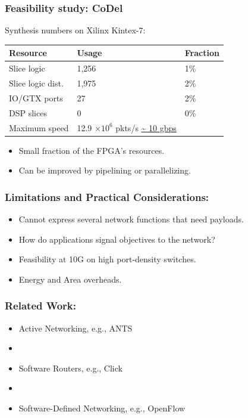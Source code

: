 \begin{Large}
\begin{frame}[plain]
\frametitle{Feasibility study: CoDel}
\begin{center}
Synthesis numbers on Xilinx Kintex-7: \\
\begin{tabular}{p{} p{} p{}}
\bf Resource & \bf Usage & \bf Fraction \\
\hline Slice logic & 1,256 & 1\% \\
Slice logic dist. & 1,975 & 2\% \\
IO/GTX ports & 27 & 2\% \\
DSP slices & 0 & 0\% \\
Maximum speed & 12.9 $\times 10^6$ pkts/s \url{~ 10 gbps} \\
\end{tabular}
\end{center}
\begin{itemize}
\item Small fraction of the FPGA's resources.
\item Can be improved by pipelining or parallelizing.
\end{itemize}
\end{frame}

\begin{frame}[plain]
\frametitle{Limitations and Practical Considerations:}
\begin{itemize}
\item Cannot express several network functions that need payloads.
\item How do applications signal objectives to the network?
\item Feasibility at 10G on high port-density  switches.
\item Energy and Area overheads.
\end{itemize}
\end{frame}

\begin{frame}[plain]
\frametitle{Related Work:}
\begin{itemize}
\item Active Networking, e.g., ANTS
\item []
\item Software Routers, e.g., Click
\item []
\item Software-Defined Networking, e.g., OpenFlow
\end{itemize}
\end{frame}


\end{Large}
